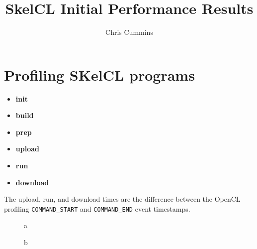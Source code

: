 
\title{SkelCL Initial Performance Results}

\author{Chris Cummins}





\maketitle

\begin{abstract}
  \noindent

\end{abstract}

\section{Profiling SKelCL programs}

\begin{itemize}
\item \textbf{init}
\item \textbf{build}
\item \textbf{prep}
\item \textbf{upload}
\item \textbf{run}
\item \textbf{download}
\end{itemize}

The upload, run, and download times are the difference between the
OpenCL profiling \texttt{COMMAND\_START} and \texttt{COMMAND\_END}
event timestamps.

\begin{figure}


\caption{a}
\label{fig:}
\end{figure}

\begin{figure}


\caption{b}
\label{fig:}
\end{figure}


